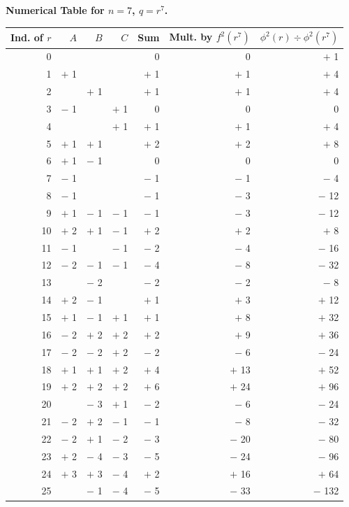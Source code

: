 \documentclass[11pt,a4paper]{book}
\begin{document}
\begin{center}
\textbf{Numerical Table for $n = 7$, $q = r^7$.}

\medskip
\begin{tabular}{|r|r|r|r|r|r|r|}
\hline
Ind. of $r$ & $A$ & $B$ & $C$ & Sum & Mult. by $f^2(r^7)$ & $\phi^2(r) \div \phi^2(r^7)$ \\
\hline
0 & & & & 0 & 0 & $+$ 1 \\
1 & $+$ 1 & & & $+$ 1 & $+$ 1 & $+$ 4 \\
2 & & $+$ 1 & & $+$ 1 & $+$ 1 & $+$ 4 \\
3 & $-$ 1 & & $+$ 1 & 0 & 0 & 0 \\
4 & & & $+$ 1 & $+$ 1 & $+$ 1 & $+$ 4 \\
5 & $+$ 1 & $+$ 1 & & $+$ 2 & $+$ 2 & $+$ 8 \\
6 & $+$ 1 & $-$ 1 & & 0 & 0 & 0 \\
7 & $-$ 1 & & & $-$ 1 & $-$ 1 & $-$ 4 \\
8 & $-$ 1 & & & $-$ 1 & $-$ 3 & $-$ 12 \\
9 & $+$ 1 & $-$ 1 & $-$ 1 & $-$ 1 & $-$ 3 & $-$ 12 \\
10 & $+$ 2 & $+$ 1 & $-$ 1 & $+$ 2 & $+$ 2 & $+$ 8 \\
11 & $-$ 1 & & $-$ 1 & $-$ 2 & $-$ 4 & $-$ 16 \\
12 & $-$ 2 & $-$ 1 & $-$ 1 & $-$ 4 & $-$ 8 & $-$ 32 \\
13 & & $-$ 2 & & $-$ 2 & $-$ 2 & $-$ 8 \\
14 & $+$ 2 & $-$ 1 & & $+$ 1 & $+$ 3 & $+$ 12 \\
15 & $+$ 1 & $-$ 1 & $+$ 1 & $+$ 1 & $+$ 8 & $+$ 32 \\
16 & $-$ 2 & $+$ 2 & $+$ 2 & $+$ 2 & $+$ 9 & $+$ 36 \\
17 & $-$ 2 & $-$ 2 & $+$ 2 & $-$ 2 & $-$ 6 & $-$ 24 \\
18 & $+$ 1 & $+$ 1 & $+$ 2 & $+$ 4 & $+$ 13 & $+$ 52 \\
19 & $+$ 2 & $+$ 2 & $+$ 2 & $+$ 6 & $+$ 24 & $+$ 96 \\
20 & & $-$ 3 & $+$ 1 & $-$ 2 & $-$ 6 & $-$ 24 \\
21 & $-$ 2 & $+$ 2 & $-$ 1 & $-$ 1 & $-$ 8 & $-$ 32 \\
22 & $-$ 2 & $+$ 1 & $-$ 2 & $-$ 3 & $-$ 20 & $-$ 80 \\
23 & $+$ 2 & $-$ 4 & $-$ 3 & $-$ 5 & $-$ 24 & $-$ 96 \\
24 & $+$ 3 & $+$ 3 & $-$ 4 & $+$ 2 & $+$ 16 & $+$ 64 \\
25 & & $-$ 1 & $-$ 4 & $-$ 5 & $-$ 33 & $-$ 132 \\

\end{tabular}
\end{center}
\end{document}
